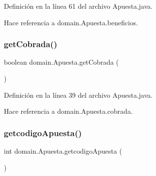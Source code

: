 Definición en la línea 61 del archivo Apuesta.\+java.


\begin{DoxyCode}{0}

\end{DoxyCode}


Hace referencia a domain.\+Apuesta.\+beneficios.

\mbox{\label{classdomain_1_1Apuesta_ae1983ee715a32fd095df5d54ab8475f1}} 
\subsubsection{\texorpdfstring{getCobrada()}{getCobrada()}}
{\footnotesize\ttfamily boolean domain.\+Apuesta.\+get\+Cobrada (\begin{DoxyParamCaption}{ }\end{DoxyParamCaption})}



Definición en la línea 39 del archivo Apuesta.\+java.


\begin{DoxyCode}{0}

\end{DoxyCode}


Hace referencia a domain.\+Apuesta.\+cobrada.

\mbox{\label{classdomain_1_1Apuesta_a5e818409c0f8e3b9d1c812b60294d967}} 
\subsubsection{\texorpdfstring{getcodigoApuesta()}{getcodigoApuesta()}}
{\footnotesize\ttfamily int domain.\+Apuesta.\+getcodigo\+Apuesta (\begin{DoxyParamCaption}{ }\end{DoxyParamCaption})}



